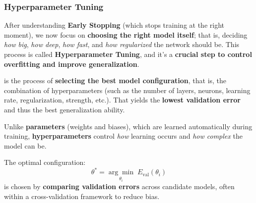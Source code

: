 \subsubsection{Hyperparameter Tuning}\label{sec:hyperparameter-tuning}

After understanding \textbf{Early Stopping} (which stops training at the right moment), we now focus on \textbf{choosing the right model itself}; that is, deciding \emph{how big}, \emph{how deep}, \emph{how fast}, and \emph{how regularized} the network should be. This process is called \textbf{Hyperparameter Tuning}, and it's a \textbf{crucial step to control overfitting and improve generalization}.

\begin{definitionbox}
     is the process of \textbf{selecting the best model configuration}, that is, the combination of hyperparameters (such as the number of layers, neurons, learning rate, regularization, strength, etc.). That yields the \textbf{lowest validation error} and thus the best generalization ability.

    \highspace
    Unlike \textbf{parameters} (weights and biases), which are learned automatically during training, \textbf{hyperparameters} control \emph{how} learning occurs and \emph{how complex} the model can be.

    \highspace
    The optimal configuration:
    \begin{equation}
        \theta^{*} = \underset{\theta_{i}}{\arg\min} \; E_{\text{val}}\left(\theta_{i}\right)
    \end{equation}
    is chosen by \textbf{comparing validation errors} across candidate models, often within a cross-validation framework to reduce bias.
\end{definitionbox}

